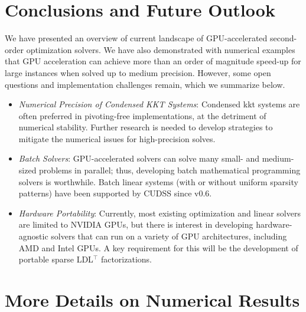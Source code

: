 \documentclass{article}
\begin{document}
\section{Conclusions and Future Outlook}\label{eqn:conclusion}
We have presented an overview of current landscape of GPU-accelerated second-order optimization solvers.
We have also demonstrated with numerical examples that GPU acceleration can achieve more than an order of magnitude speed-up for large instances when solved up to medium precision. However, some open questions and implementation challenges remain, which we summarize below.

\begin{itemize}[leftmargin=*,itemsep=0pt,parsep=0pt,partopsep=0pt]
\item \textit{Numerical Precision of Condensed KKT Systems}: Condensed \gls*{kkt} systems are often preferred in pivoting-free implementations, at the detriment of numerical stability. Further research is needed to develop strategies to mitigate the numerical issues for high-precision solves.
\item \textit{Batch Solvers}: GPU-accelerated solvers can solve many small- and medium-sized problems in parallel; thus, developing batch mathematical programming solvers is worthwhile. Batch linear systems (with or without uniform sparsity patterns) have been supported by CUDSS since v0.6.
\item \textit{Hardware Portability}: Currently, most existing optimization and linear solvers are limited to NVIDIA GPUs, but there is interest in developing hardware-agnostic solvers that can run on a variety of GPU architectures, including AMD and Intel GPUs. A key requirement for this will be the development of portable sparse LDL$^\top$ factorizations.
\end{itemize}





\appendix
{}

\section{More Details on Numerical Results}\label{apx:num}
\end{document}
